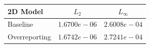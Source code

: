\begin{table}[ht]
\centering
\begin{tabular}{lcc}
\hline
2D Model & $L_2$ & $L_\infty$ \\
\hline
Baseline & $1.6700e-06$ & $2.6008e-04$ \\
Overreporting & $1.6742e-06$ & $2.7241e-04$ \\
\hline
\end{tabular}
\end{table}
